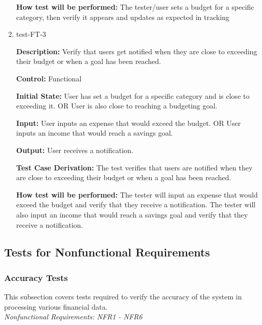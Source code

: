 \documentclass[12pt, titlepage]{article}
\begin{document}
\begin{enumerate}
\textbf{How test will be performed:} The tester/user sets a budget for a specific category, then verify it appears and updates as expected in tracking

\item{test-FT-3\\}

\textbf{Description:} Verify that users get notified when they are close to
exceeding their budget or when a goal has been reached.

\textbf{Control:} Functional

\textbf{Initial State:} User has set a budget for a specific category and is
close to exceeding it. OR User is also close to reaching a budgeting goal.

\textbf{Input:} User inputs an expense that would exceed the budget. OR User
inputs an income that would reach a savings goal.

\textbf{Output:} User receives a notification.

\textbf{Test Case Derivation:} The test verifies that users are notified when
they are close to exceeding their budget or when a goal has been reached.

\textbf{How test will be performed:} The tester will input an expense that would
exceed the budget and verify that they receive a notification. The tester will
also input an income that would reach a savings goal and verify that they receive
a notification.

\end{enumerate}

\subsection{Tests for Nonfunctional Requirements}

\subsubsection{Accuracy Tests}

This subsection covers tests required to verify the accuracy of the system in processing various financial data.\\
\textit{Nonfunctional Requirements: NFR1 - NFR6}
\end{document}

